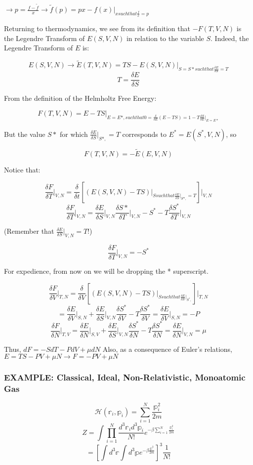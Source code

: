 \documentclass{article}
\newcommand{\pardif}[2]{\frac{\delta#1}{\delta#2}}
\newcommand{\thermdif}[4]{\frac{\delta#1}{\delta#2}\vert_{#3,#4}}
\newcommand{\sumser}[2]{\sum\limits_{#1}^{#2}}
\begin{document}

$\rightarrow p=\frac{f-\tilde{f}}{x}\rightarrow\tilde{f}(p)=px-f(x)\vert_{x such that \frac{f}{x}=p }$

Returning to thermodynamics, we see from its definition that $-F(T,V,N)$ is the Legendre Transform of $E(S,V,N)$ in relation to the variable $S$.  Indeed, the Legendre Transform of $E$ is: 

$$E(S,V,N)\rightarrow\tilde{E}(T,V,N)=TS-E(S,V,N)\vert_{S=S* such that \pardif{E}{S}=T}$$
$$T=\pardif{E}{S}$$

From the definition of the Helmholtz Free Energy:

$$F(T,V,N)=E-TS\vert_{E=E*, such that 0=\frac{\delta}{\delta E}(E-TS)=1-T\pardif{S}{E}\vert_{E=E*}}$$

But the value $S*$ for which $\thermdif{E}{S}{S*}{ }=T$ corresponds to $E^{*}=E(S^{*},V,N)$, so

$$F(T,V,N)=-\tilde{E}(E,V,N)$$

Notice that:

$$\thermdif{F}{T}{V}{N}=\frac{\delta}{\delta t}[(E(S,V,N)-TS)\vert_{S such that \thermdif{E}{S}{S*}{ }=T}]\vert_{V,N}$$
$$\thermdif{F}{T}{V}{N}=\thermdif{E}{S}{V}{N}\thermdif{S*}{T}{V}{N}-S^{*}-T\thermdif{S^{*}}{T}{V}{N}$$

(Remember that $\thermdif{E}{S}{V}{N}=T$!)

$$\thermdif{F}{T}{V}{N}=-S^{*}$$

For expedience, from now on we will be dropping the * superscript.

$$\thermdif{F}{V}{T}{N}=\frac{\delta}{\delta V}[(E(S,V,N)-TS)\vert_{S such that \thermdif{E}{S}{S^{*}}{ }}]\vert_{T,N}$$
$$=\thermdif{E}{V}{S}{N}+\thermdif{E}{S}{V}{N}\pardif{S^{*}}{V}-T\pardif{S^{*}}{V}=\thermdif{E}{V}{S}{N}=-P$$
$$\thermdif{F}{N}{T}{V}=\thermdif{E}{N}{S}{V}+\thermdif{E}{S}{V}{N}\pardif{S^{*}}{N}-T\pardif{S^{*}}{N}=\thermdif{E}{N}{V}{N}=\mu$$

Thus, $dF=-SdT-PdV+\mu dN$  Also, as a consequence of Euler's relations, $E=TS-PV+\mu N\rightarrow F=-PV+\mu N$

\subsubsection{EXAMPLE: Classical, Ideal, Non-Relativistic, Monoatomic Gas}

$$\mathcal{H}(\mathbb{r}_{i},\mathbb{p}_{i})=\sumser{i=1}{N}\frac{\mathbb{p}_{i}^{2}}{2m}$$
$$Z=\int\prod_{i=1}^{N}\frac{d^{3}\mathbb{r}_{i}d^{3}\mathbb{p}_{i}}{N!}e^{-\beta\sum_{i=1}^{N}\frac{\mathbb{p}_{i}^{2}}{2m}}$$
$$=[\int d^{3}\mathbb{r}\int d^{3}\mathbb{p}e^{-\beta\frac{\mathbb{p}^{2}}{2m}}]^{3}\frac{1}{N!}$$
\end{document}
